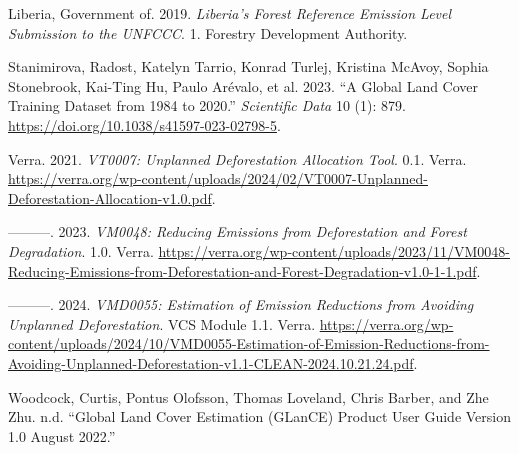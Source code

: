\documentclass[
]{article}
\newlength{\cslhangindent}
\newenvironment{CSLReferences}[2] %
 {\begin{list}{}{%
  \setlength{\itemindent}{0pt}
  \setlength{\leftmargin}{0pt}
  \setlength{\parsep}{0pt}
  \ifodd #1
   \setlength{\leftmargin}{\cslhangindent}
   \setlength{\itemindent}{-1\cslhangindent}
  \fi
  \setlength{\itemsep}{#2\baselineskip}}}
 {\end{list}}
\begin{document}
\label{refs}
\begin{CSLReferences}{1}{0}
Liberia, Government of. 2019. \emph{Liberia's Forest Reference Emission
Level Submission to the UNFCCC}. 1. Forestry Development Authority.

Stanimirova, Radost, Katelyn Tarrio, Konrad Turlej, Kristina McAvoy,
Sophia Stonebrook, Kai-Ting Hu, Paulo Arévalo, et al. 2023. {``A Global
Land Cover Training Dataset from 1984 to 2020.''} \emph{Scientific Data}
10 (1): 879. \url{https://doi.org/10.1038/s41597-023-02798-5}.

Verra. 2021. \emph{VT0007: Unplanned Deforestation Allocation Tool}.
0.1. Verra.
\url{https://verra.org/wp-content/uploads/2024/02/VT0007-Unplanned-Deforestation-Allocation-v1.0.pdf}.

---------. 2023. \emph{VM0048: Reducing Emissions from Deforestation and
Forest Degradation}. 1.0. Verra.
\url{https://verra.org/wp-content/uploads/2023/11/VM0048-Reducing-Emissions-from-Deforestation-and-Forest-Degradation-v1.0-1-1.pdf}.

---------. 2024. \emph{VMD0055: Estimation of Emission Reductions from
Avoiding Unplanned Deforestation}. VCS Module 1.1. Verra.
\url{https://verra.org/wp-content/uploads/2024/10/VMD0055-Estimation-of-Emission-Reductions-from-Avoiding-Unplanned-Deforestation-v1.1-CLEAN-2024.10.21.24.pdf}.

Woodcock, Curtis, Pontus Olofsson, Thomas Loveland, Chris Barber, and
Zhe Zhu. n.d. {``Global Land Cover Estimation (GLanCE) Product User
Guide Version 1.0 August 2022.''}

\end{CSLReferences}
\end{document}
